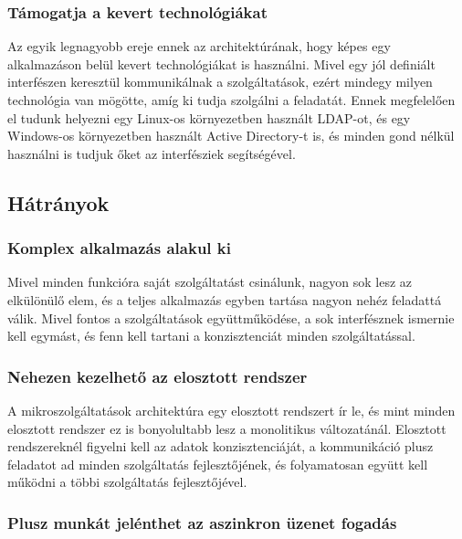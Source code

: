 \documentclass[11pt,magyar,a4paper,twoside,]{report}
\begin{document}
\subsubsection{Támogatja a kevert
technológiákat}\label{tuxe1mogatja-a-kevert-technoluxf3giuxe1kat}

Az egyik legnagyobb ereje ennek az architektúrának, hogy képes egy
alkalmazáson belül kevert technológiákat is használni. Mivel egy jól
definiált interfészen keresztül kommunikálnak a szolgáltatások, ezért
mindegy milyen technológia van mögötte, amíg ki tudja szolgálni a
feladatát. Ennek megfelelően el tudunk helyezni egy Linux-os
környezetben használt LDAP-ot, és egy Windows-os környezetben használt
Active Directory-t is, és minden gond nélkül használni is tudjuk őket az
interfésziek segítségével.

\subsection{Hátrányok}\label{huxe1truxe1nyok}

\subsubsection{Komplex alkalmazás alakul
ki}\label{komplex-alkalmazuxe1s-alakul-ki}

Mivel minden funkcióra saját szolgáltatást csinálunk, nagyon sok lesz az
elkülönülő elem, és a teljes alkalmazás egyben tartása nagyon nehéz
feladattá válik. Mivel fontos a szolgáltatások együttműködése, a sok
interfésznek ismernie kell egymást, és fenn kell tartani a
konzisztenciát minden szolgáltatással.

\subsubsection{Nehezen kezelhető az elosztott
rendszer}\label{nehezen-kezelhetux151-az-elosztott-rendszer}

A mikroszolgáltatások architektúra egy elosztott rendszert ír le, és
mint minden elosztott rendszer ez is bonyolultabb lesz a monolitikus
változatánál. Elosztott rendszereknél figyelni kell az adatok
konzisztenciáját, a kommunikáció plusz feladatot ad minden szolgáltatás
fejlesztőjének, és folyamatosan együtt kell működni a többi szolgáltatás
fejlesztőjével.

\subsubsection{Plusz munkát jelénthet az aszinkron üzenet
fogadás}\label{plusz-munkuxe1t-jeluxe9nthet-az-aszinkron-uxfczenet-fogaduxe1s}
\end{document}
